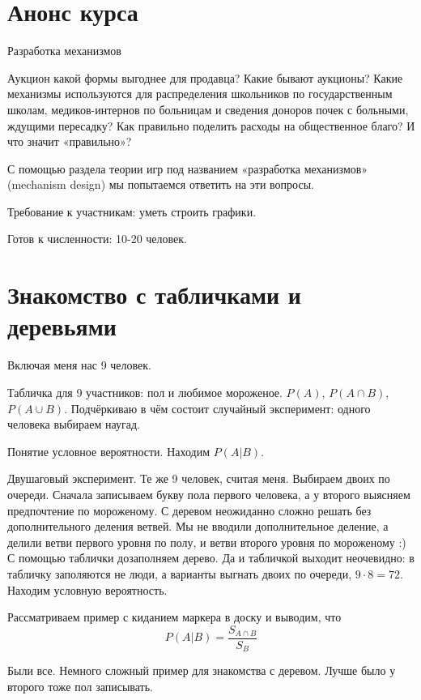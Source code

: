 \documentclass[a4paper, 12pt]{article}
\begin{document}
\section{Анонс курса}

Разработка механизмов

Аукцион какой формы выгоднее для продавца? Какие бывают аукционы?  Какие механизмы используются для распределения школьников по государственным школам, медиков-интернов по больницам и сведения доноров почек с больными, ждущими пересадку? Как правильно поделить расходы на общественное благо? И что значит «правильно»?

С помощью раздела теории игр под названием «разработка механизмов» (mechanism design) мы попытаемся ответить на эти вопросы.

Требование к участникам: уметь строить графики.

Готов к численности: 10-20 человек.

\section{Знакомство с табличками и деревьями}

Включая меня нас 9 человек.

Табличка для 9 участников: пол и любимое мороженое. $P(A)$, $P(A\cap B)$, $P(A\cup B)$.
Подчёркиваю в чём состоит случайный эксперимент: одного человека выбираем наугад.

Понятие условное вероятности. Находим $P(A|B)$.

Двушаговый эксперимент. Те же 9 человек, считая меня. Выбираем двоих по очереди. Сначала записываем букву пола первого человека, а у второго выясняем предпочтение по мороженому. С деревом неожиданно сложно решать без дополнительного деления ветвей. Мы не вводили дополнительное деление, а делили ветви первого уровня по полу, и ветви второго уровня по мороженому :) С помощью таблички дозаполняем дерево. Да и табличкой выходит неочевидно: в табличку заполяются не люди, а варианты выгнать двоих по очереди, $9\cdot 8 = 72$. Находим условную вероятность.

Рассматриваем пример с киданием маркера в доску и выводим, что
\[
P(A|B) = \frac{S_{A\cap B}}{S_B}
\]

Были все. Немного сложный пример для знакомства с деревом. Лучше было у второго тоже пол записывать.
\end{document}
